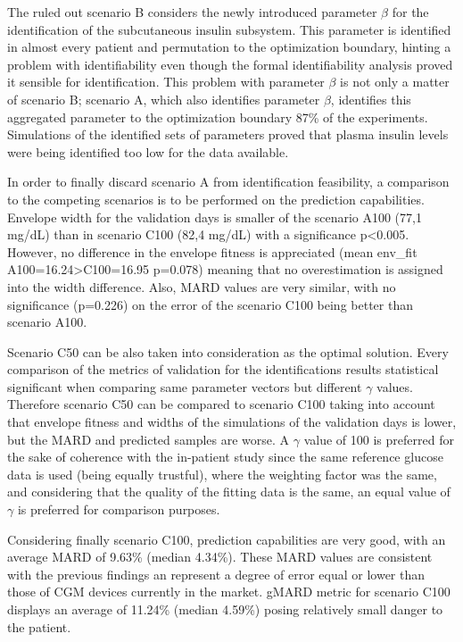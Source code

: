 The ruled out scenario B considers the newly introduced parameter $\beta$ for the identification of the subcutaneous insulin subsystem. This parameter is identified in almost every patient and permutation to the optimization boundary, hinting a problem with identifiability even though the formal identifiability analysis proved it sensible for identification. This problem with parameter $\beta$ is not only a matter of scenario B; scenario A, which also identifies parameter $\beta$, identifies this aggregated parameter to the optimization boundary 87\% of the experiments. Simulations of the identified sets of parameters proved that plasma insulin levels were being identified too low for the data available.

In order to finally discard scenario A from identification feasibility, a comparison to the competing scenarios is to be performed on the prediction capabilities. Envelope width for the validation days is smaller of the scenario A100 (77,1 mg/dL) than in scenario C100 (82,4 mg/dL) with a significance p<0.005. However, no difference in the envelope fitness is appreciated (mean env\_fit A100=16.24>C100=16.95 p=0.078) meaning that no overestimation is assigned into the width difference. Also, MARD values are very similar, with no significance (p=0.226) on the error of the scenario C100 being better than scenario A100. 

Scenario C50 can be also taken into consideration as the optimal solution. Every comparison of the metrics of validation for the identifications results statistical significant when comparing same parameter vectors but different $\gamma$ values. Therefore scenario C50 can be compared to scenario C100 taking into account that envelope fitness and widths of the simulations of the validation days is lower, but the MARD and predicted samples are worse. A $\gamma$ value of 100 is preferred for the sake of coherence with the in-patient study since the same reference glucose data is used (being equally trustful), where the weighting factor was the same, and considering that the quality of the fitting data is the same, an equal value of $\gamma$ is preferred for comparison purposes.

Considering finally scenario C100, prediction capabilities are very good, with an average MARD of 9.63\% (median 4.34\%). These MARD values are consistent with the previous findings an represent a degree of error equal or lower than those of CGM devices currently in the market. gMARD metric for scenario C100 displays an average of 11.24\% (median 4.59\%) posing relatively small danger to the patient.

